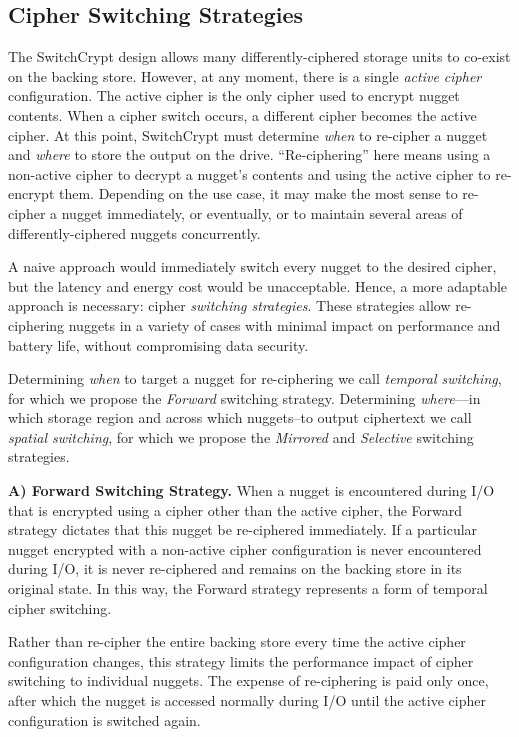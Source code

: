 \subsection{Cipher Switching Strategies} \label{subsec:strategies}

The SwitchCrypt design allows many differently-ciphered storage units to
co-exist on the backing store. However, at any moment, there is a single
\emph{active cipher} configuration. The active cipher is the only cipher used to
encrypt nugget contents. When a cipher switch occurs, a different cipher becomes
the active cipher. At this point, SwitchCrypt must determine \emph{when} to
re-cipher a nugget and \emph{where} to store the output on the drive.
``Re-ciphering'' here means using a non-active cipher to decrypt a nugget's
contents and using the active cipher to re-encrypt them. Depending on
 the use case, it may make the most sense to re-cipher a nugget
immediately, or eventually, or to maintain several areas of differently-ciphered
nuggets concurrently.

A naive approach would immediately switch every nugget to the desired cipher,
but the latency and energy cost would be unacceptable. Hence, a more adaptable
approach is necessary: cipher \emph{switching strategies}. These strategies
allow re-ciphering nuggets in a variety of cases with minimal impact on
performance and battery life, without compromising data security.

Determining \emph{when} to target a nugget for re-ciphering we call
\emph{temporal switching}, for which we propose the \emph{Forward} switching
strategy. Determining \emph{where}---in which storage region and across which
nuggets--to output ciphertext we call \emph{spatial switching}, for which we
propose the \emph{Mirrored} and \emph{Selective} switching strategies.

\textbf{A) Forward Switching Strategy.} When a nugget is encountered during I/O
that is encrypted using a cipher other than the active cipher, the Forward
strategy dictates that this nugget be re-ciphered immediately. If a particular
nugget encrypted with a non-active cipher configuration is never encountered
during I/O, it is never re-ciphered and remains on the backing store in its
original state. In this way, the Forward strategy represents a form of temporal
cipher switching.

Rather than re-cipher the entire backing store every time the active cipher
configuration changes, this strategy limits the performance impact of cipher
switching to individual nuggets. The expense of re-ciphering is paid only once,
after which the nugget is accessed normally during I/O until the active cipher
configuration is switched again.


